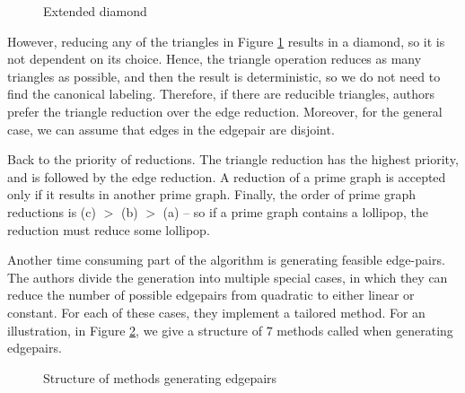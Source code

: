 \begin{figure}[h!]\centering
    
    \caption{Extended diamond}
    \label{fig:diamond_plus_triangle}
\end{figure}

However, reducing any of the triangles in Figure \ref{fig:diamond_plus_triangle} results in a diamond, so it is not dependent on its choice. Hence, the triangle operation reduces as many triangles as possible, and then the result is deterministic, so we do not need to find the canonical labeling. Therefore, if there are reducible triangles, authors prefer the triangle reduction over the edge reduction. Moreover, for the general case, we can assume that edges in the edgepair are disjoint.

Back to the priority of reductions. The triangle reduction has the highest priority, and is followed by the edge reduction. A reduction of a prime graph is accepted only if it results in another prime graph. Finally, the order of prime graph reductions is (c) $>$ (b) $>$ (a) -- so if a prime graph contains a lollipop, the reduction must reduce some lollipop.

Another time consuming part of the algorithm is generating feasible edge-pairs. The authors divide the generation into multiple special cases, in which they can reduce the number of possible edgepairs from quadratic to either linear or constant. For each of these cases, they implement a tailored method. For an illustration, in Figure \ref{fig:edgepairs_methods}, we give a structure of $7$ methods called when generating edgepairs.

\begin{figure}[h!]
\caption{Structure of methods generating edgepairs}
\label{fig:edgepairs_methods}
\end{figure}

